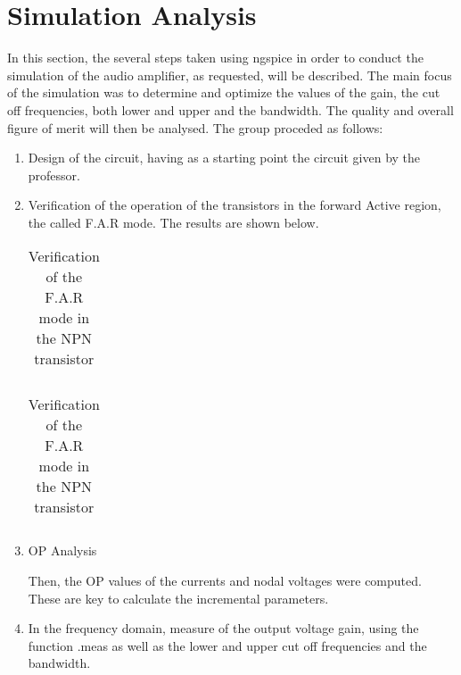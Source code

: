 \section{Simulation Analysis}
\label{section:sim}
 
In this section, the several steps taken using ngspice in order to conduct the simulation of the audio amplifier, as requested, will be described. The main focus of the simulation was to determine and optimize the values of the gain, the cut off frequencies, both lower and upper and the bandwidth. The quality and overall figure of merit will then be analysed.
The group proceded as follows:

\begin{enumerate}
\item Design of the circuit, having as a starting point the circuit given by the professor.

\item Verification of the operation of the transistors in the forward Active region, the called F.A.R mode. The results are shown below.

\begin{table}[ht]
  \centering
  \begin{tabular}{|l|r|}
    \hline    
     \end{tabular}
  \caption{Verification of the F.A.R mode in the NPN transistor}
 
\end{table}


\begin{table}[ht]
  \centering
  \begin{tabular}{|l|r|}
    \hline    
     \end{tabular}
  \caption{Verification of the F.A.R mode in the NPN transistor}
    
\end{table}



\item OP Analysis
\par Then, the OP values of the currents and nodal voltages were computed. These are key to calculate the incremental parameters.

  
\item  In the frequency domain, measure of the output voltage gain, using the function .meas as well as the lower and upper cut off frequencies and the bandwidth.



\end{enumerate}
